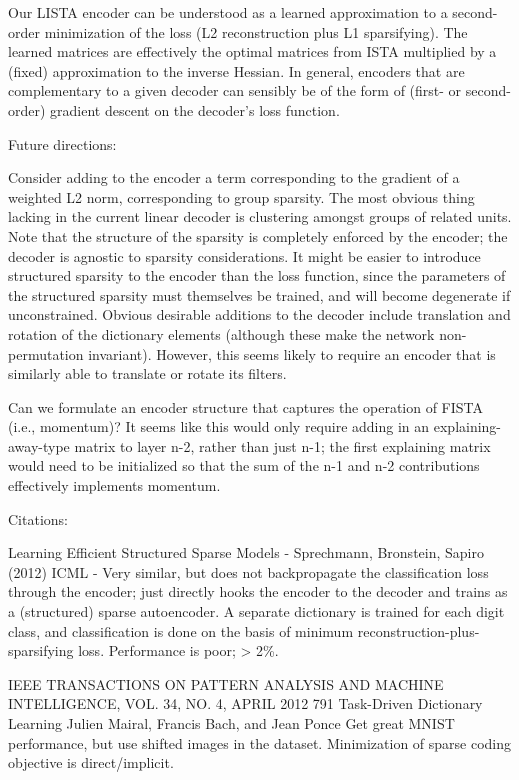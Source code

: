 Our LISTA encoder can be understood as a learned approximation to a second-order minimization of the loss (L2 reconstruction plus L1 sparsifying).  The learned matrices are effectively the optimal matrices from ISTA multiplied by a (fixed) approximation to the inverse Hessian.  In general, encoders that are complementary to a given decoder can sensibly be of the form of (first- or second-order) gradient descent on the decoder's loss function. 



Future directions:

Consider adding to the encoder a term corresponding to the gradient of a weighted L2 norm, corresponding to group sparsity.  The most obvious thing lacking in the current linear decoder is clustering amongst groups of related units.  Note that the structure of the sparsity is completely enforced by the encoder; the decoder is agnostic to sparsity considerations.  It might be easier to introduce structured sparsity to the encoder than the loss function, since the parameters of the structured sparsity must themselves be trained, and will become degenerate if unconstrained.
Obvious desirable additions to the decoder include translation and rotation of the dictionary elements (although these make the network non-permutation invariant).  However, this seems likely to require an encoder that is similarly able to translate or rotate its filters.

Can we formulate an encoder structure that captures the operation of FISTA (i.e., momentum)?  It seems like this would only require adding in an explaining-away-type matrix to layer n-2, rather than just n-1; the first explaining matrix would need to be initialized so that the sum of the n-1 and n-2 contributions effectively implements momentum. 



Citations:

Learning Efficient Structured Sparse Models - Sprechmann, Bronstein, Sapiro (2012) ICML - Very similar, but does not backpropagate the classification loss through the encoder; just directly hooks the encoder to the decoder and trains as a (structured) sparse autoencoder.  A separate dictionary is trained for each digit class, and classification is done on the basis of minimum reconstruction-plus-sparsifying loss.  Performance is poor; > 2\%.  

IEEE TRANSACTIONS ON PATTERN ANALYSIS AND MACHINE INTELLIGENCE, VOL. 34, NO. 4, APRIL 2012 791
Task-Driven Dictionary Learning Julien Mairal, Francis Bach, and Jean Ponce
Get great MNIST performance, but use shifted images in the dataset.  Minimization of sparse coding objective is direct/implicit.

